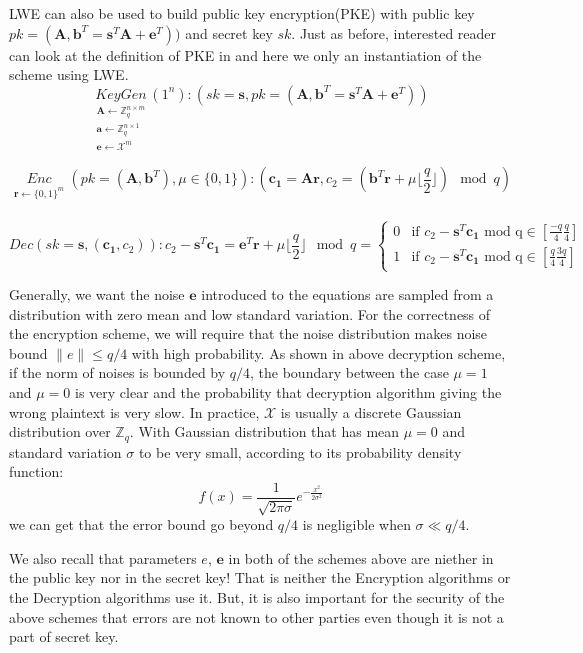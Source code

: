 \documentclass[usletter]{article}
\begin{document}
LWE can also be used to build public key encryption(PKE) with public key $pk = (\pmb{A}, \pmb{b}^T=\pmb{s}^T\pmb{A}+\pmb{e}^T))$ and secret key $sk$. Just as before, interested reader can look at the definition of PKE in  and here we only an instantiation of the scheme using LWE.
$$\underset{\substack{
\pmb{A}\leftarrow\mathbb{Z}_q^{n\times m}\\
\pmb{a}\leftarrow\mathbb{Z}_q^{n\times 1}\\
\pmb{e}\leftarrow\mathcal{X}^m}}{KeyGen}(1^n): (sk=\pmb{s},pk=(\pmb{A}, \pmb{b}^T=\pmb{s}^T\pmb{A}+\pmb{e}^T))$$


$$\underset{\substack{
\pmb{r}\leftarrow\{0,1\}^m\\}}{Enc}(pk = (\pmb{A}, \pmb{b}^T) ,\mu\in\{0,1\}): (\pmb{c_1}=\pmb{A}\pmb{r}, c_2=(\pmb{b}^T\pmb{r}+\mu\lfloor\frac{q}{2}\rfloor)\mod q)$$

$$Dec(sk=\pmb{s},(\pmb{c_1},c_2)): c_2-\pmb{s}^T\pmb{c_1}=\pmb{e}^T\pmb{r}+\mu\lfloor\frac{q}{2}\rfloor \mod q =  \begin{cases}
    0 & \text{if $c_2-\pmb{s}^T\pmb{c_1}$ mod q}  \in [\frac{-q}{4} \frac{q}{4} ] \\%
    1 & \text{if $c_2-\pmb{s}^T\pmb{c_1}$ mod q}  \in [\frac{q}{4} \frac{3q}{4} ]%
  \end{cases}$$
	
\begin{remark}
Generally, we want the noise $\pmb{e}$ introduced to the equations are sampled from a distribution with zero mean and low standard variation. For the correctness of the encryption scheme, we will require that the noise distribution makes noise bound $\parallel e\parallel\leq q/4$ with high probability. As shown in above decryption scheme, if the norm of noises is bounded by $q/4$, the boundary between the case $\mu=1$ and $\mu=0$ is very clear and the probability that decryption algorithm giving the wrong plaintext is very slow. In practice, $\mathcal{X}$ is usually a discrete Gaussian distribution over $\mathbb{Z}_q$. With Gaussian distribution that has mean $\mu=0$ and standard variation $\sigma$ to be very small, according to its probability density function:
$$f(x)=\frac{1}{\sqrt{2\pi\sigma}}e^{-\frac{x^2}{2\sigma^2}}$$
we can get that the error bound go beyond $q/4$ is negligible when $\sigma\ll q/4$.
\end{remark}

\begin{remark}
We also recall that parameters $e$, $\pmb{e}$ in both of the schemes above are niether in the public key nor in the secret key! That is neither the Encryption algorithms or the Decryption algorithms use it. But, it is also important for the security of the above schemes that errors are not known to other parties even though it is not a part of secret key.
\end{remark}
\end{document}
